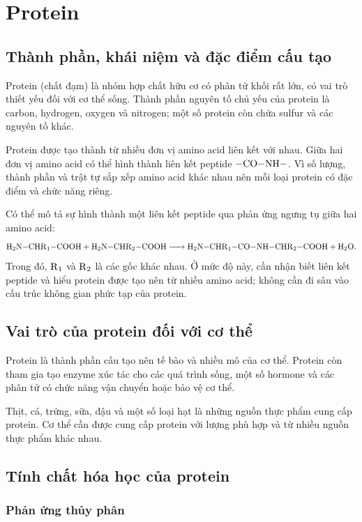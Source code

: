 \section{Protein}

\subsection{Thành phần, khái niệm và đặc điểm cấu tạo}

Protein (chất đạm) là nhóm hợp chất hữu cơ có phân tử khối rất lớn, có vai trò thiết yếu đối với cơ thể sống. Thành phần nguyên tố chủ yếu của protein là carbon, hydrogen, oxygen và nitrogen; một số protein còn chứa sulfur và các nguyên tố khác.

Protein được tạo thành từ nhiều đơn vị amino acid liên kết với nhau. Giữa hai đơn vị amino acid có thể hình thành liên kết peptide \(\ce{-CO-NH-}\). Vì số lượng, thành phần và trật tự sắp xếp amino acid khác nhau nên mỗi loại protein có đặc điểm và chức năng riêng.

Có thể mô tả sự hình thành một liên kết peptide qua phản ứng ngưng tụ giữa hai amino acid:
\[
\ce{H2N-CHR1-COOH + H2N-CHR2-COOH
-> H2N-CHR1-CO-NH-CHR2-COOH + H2O}.
\]
Trong đó, \(\ce{R1}\) và \(\ce{R2}\) là các gốc khác nhau. Ở mức độ này, cần nhận biết liên kết peptide và hiểu protein được tạo nên từ nhiều amino acid; không cần đi sâu vào cấu trúc không gian phức tạp của protein.

\subsection{Vai trò của protein đối với cơ thể}

Protein là thành phần cấu tạo nên tế bào và nhiều mô của cơ thể. Protein còn tham gia tạo enzyme xúc tác cho các quá trình sống, một số hormone và các phân tử có chức năng vận chuyển hoặc bảo vệ cơ thể.

Thịt, cá, trứng, sữa, đậu và một số loại hạt là những nguồn thực phẩm cung cấp protein. Cơ thể cần được cung cấp protein với lượng phù hợp và từ nhiều nguồn thực phẩm khác nhau.

\subsection{Tính chất hóa học của protein}

\subsubsection*{Phản ứng thủy phân}


